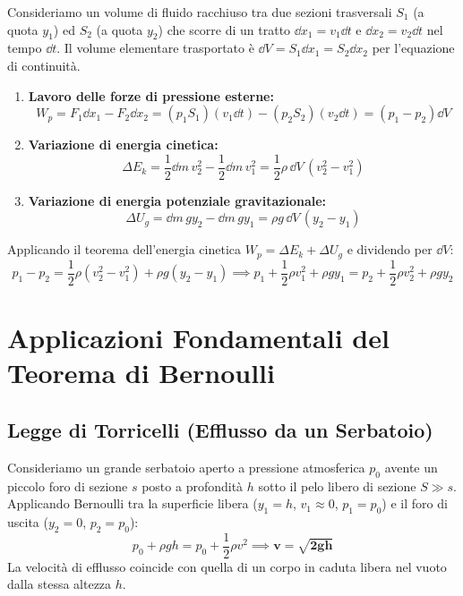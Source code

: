 \begin{dimostrazione}
Consideriamo un volume di fluido racchiuso tra due sezioni trasversali $S_1$ (a quota $y_1$) ed $S_2$ (a quota $y_2$) che scorre di un tratto $\dd x_1 = v_1 \dd t$ e $\dd x_2 = v_2 \dd t$ nel tempo $\dd t$. Il volume elementare trasportato è $\dd V = S_1 \dd x_1 = S_2 \dd x_2$ per l'equazione di continuità.
\begin{enumerate}
    \item \textbf{Lavoro delle forze di pressione esterne:}
    \begin{equation}
        W_p = F_1 \dd x_1 - F_2 \dd x_2 = (p_1 S_1)(v_1 \dd t) - (p_2 S_2)(v_2 \dd t) = (p_1 - p_2)\dd V
    \end{equation}
    \item \textbf{Variazione di energia cinetica:}
    \begin{equation}
        \Delta E_k = \frac{1}{2}\dd m\,v_2^2 - \frac{1}{2}\dd m\,v_1^2 = \frac{1}{2}\rho\,\dd V\,(v_2^2 - v_1^2)
    \end{equation}
    \item \textbf{Variazione di energia potenziale gravitazionale:}
    \begin{equation}
        \Delta U_g = \dd m\,g y_2 - \dd m\,g y_1 = \rho g\,\dd V\,(y_2 - y_1)
    \end{equation}
\end{enumerate}
Applicando il teorema dell'energia cinetica $W_p = \Delta E_k + \Delta U_g$ e dividendo per $\dd V$:
\begin{equation}
    p_1 - p_2 = \frac{1}{2}\rho (v_2^2 - v_1^2) + \rho g (y_2 - y_1) \implies p_1 + \frac{1}{2}\rho v_1^2 + \rho g y_1 = p_2 + \frac{1}{2}\rho v_2^2 + \rho g y_2
\end{equation}
\end{dimostrazione}

\section{Applicazioni Fondamentali del Teorema di Bernoulli}
\label{sec:applicazioni_bernoulli}

\subsection{Legge di Torricelli (Efflusso da un Serbatoio)}
Consideriamo un grande serbatoio aperto a pressione atmosferica $p_0$ avente un piccolo foro di sezione $s$ posto a profondità $h$ sotto il pelo libero di sezione $S \gg s$.
Applicando Bernoulli tra la superficie libera ($y_1 = h$, $v_1 \approx 0$, $p_1 = p_0$) e il foro di uscita ($y_2 = 0$, $p_2 = p_0$):
\begin{equation}
    p_0 + \rho g h = p_0 + \frac{1}{2}\rho v^2 \implies \mathbf{v = \sqrt{2gh}}
    \label{eq:torricelli_fluidi}
\end{equation}
La velocità di efflusso coincide con quella di un corpo in caduta libera nel vuoto dalla stessa altezza $h$.

